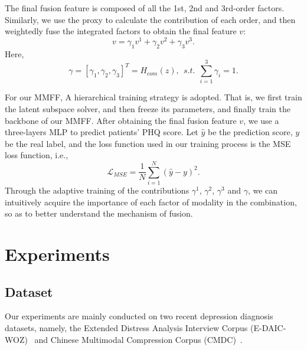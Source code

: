 \documentclass{article}
\begin{document}
The final fusion feature is composed of all the 1st, 2nd and 3rd-order factors. Similarly, we use the proxy to calculate the contribution of each order, and then weightedly fuse the integrated factors to obtain the final feature $v$:
\begin{equation}
    v = \gamma_1v^1 + \gamma_2v^2 + \gamma_3v^3.
\end{equation}
Here,
\begin{equation}
	\gamma = [\gamma_1,\gamma_2,\gamma_3]^T= H_{com}(z),\ \ s.t.\ \ \sum_{i=1}^3 \gamma_i = 1.
\end{equation}

For our MMFF, A hierarchical training strategy is adopted. That is, we first train the latent subspace solver, and then freeze its parameters, and finally train the backbone of our MMFF. After obtaining the final fusion feature $v$, we use a three-layers MLP to predict patients' PHQ score. Let $\hat{y}$ be the prediction score, $y$ be the real label, and the loss function used in our training process is the MSE loss function, i.e.,
\begin{equation}
	\mathcal L_{MSE} = \frac{1}{N} \sum_{i=1}^N (\hat{y} - y)^2.
\end{equation}
Through the adaptive training of the contributions $\gamma^1$, $\gamma^2$, $\gamma^3$ and $\gamma$, we can intuitively acquire the importance of each factor of modality in the combination, so as to better understand the mechanism of fusion.


\section{Experiments}

\subsection{Dataset}
Our experiments are mainly conducted on two recent depression diagnosis datasets, namely, the Extended Distress Analysis Interview Corpus (E-DAIC-WOZ)~\cite{AVEC2019,DAIC} and Chinese Multimodal Compression Corpus (CMDC)~\cite{CMDC}.
\end{document}
